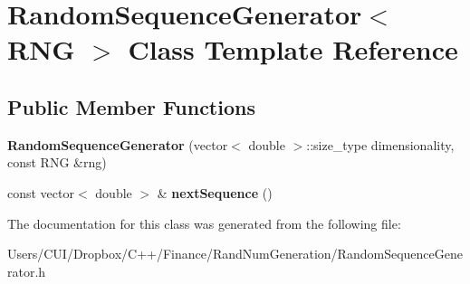 \hypertarget{class_random_sequence_generator}{}\section{Random\+Sequence\+Generator$<$ R\+NG $>$ Class Template Reference}
\label{class_random_sequence_generator}
\subsection*{Public Member Functions}
\begin{DoxyCompactItemize}
\item 
\hypertarget{class_random_sequence_generator_a148644138c29dae6ebe57657c8ca2cce}{}\label{class_random_sequence_generator_a148644138c29dae6ebe57657c8ca2cce} 
{\bfseries Random\+Sequence\+Generator} (vector$<$ double $>$\+::size\+\_\+type dimensionality, const R\+NG \&rng)
\item 
\hypertarget{class_random_sequence_generator_a63f2d6fdb7f7bab6cdf3506f91cc814c}{}\label{class_random_sequence_generator_a63f2d6fdb7f7bab6cdf3506f91cc814c} 
const vector$<$ double $>$ \& {\bfseries next\+Sequence} ()
\end{DoxyCompactItemize}


The documentation for this class was generated from the following file\+:\begin{DoxyCompactItemize}
\item 
Users/\+C\+U\+I/\+Dropbox/\+C++/\+Finance/\+Rand\+Num\+Generation/Random\+Sequence\+Generator.\+h\end{DoxyCompactItemize}
